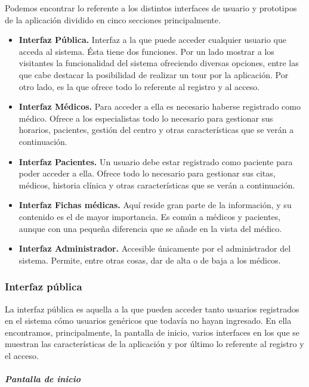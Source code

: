 \documentclass[a4paper,oneside,11pt]{book}
\begin{document}
	Podemos encontrar lo referente a los distintos interfaces de usuario y prototipos de la aplicación dividido en cinco secciones principalmente.
	\begin{itemize}
	\item \textbf{Interfaz Pública.} Interfaz a la que puede acceder cualquier usuario que acceda al sistema. Ésta tiene dos funciones. Por un lado mostrar a los visitantes la funcionalidad del sistema ofreciendo diversas opciones, entre las que cabe destacar la posibilidad de realizar un tour por la aplicación. Por otro lado, es la que ofrece todo lo referente al registro y al acceso.
	\item \textbf{Interfaz Médicos.} Para acceder a ella es necesario haberse registrado como médico. Ofrece a los especialistas todo lo necesario para gestionar sus horarios, pacientes, gestión del centro y otras características que se verán a continuación.
	\item \textbf{Interfaz Pacientes.} Un usuario debe estar registrado como paciente para poder acceder a ella. Ofrece todo lo necesario para gestionar sus citas, médicos, historia clínica y otras características que se verán a continuación.
	\item \textbf{Interfaz Fichas médicas.} Aquí reside gran parte de la información, y su contenido es el de mayor importancia. Es común a médicos y pacientes, aunque con una pequeña diferencia que se añade en la vista del médico.
	\item \textbf{Interfaz Administrador.} Accesible únicamente por el administrador del sistema. Permite, entre otras cosas, dar de alta o de baja a los médicos.
	\end{itemize}
	
	\subsubsection{Interfaz pública} %
		\label{sub:interfaz_publica}
		
		La interfaz pública es aquella a la que pueden acceder tanto usuarios registrados en el sistema cómo usuarios genéricos que todavía no hayan ingresado. En ella encontramos, principalmente, la pantalla de inicio, varios interfaces en los que se muestran las características de la aplicación y por último lo referente al registro y el acceso.
		
		\subparagraph{Pantalla de inicio} %
		\label{par:pantalla_de_inicio}
		
\end{document}
